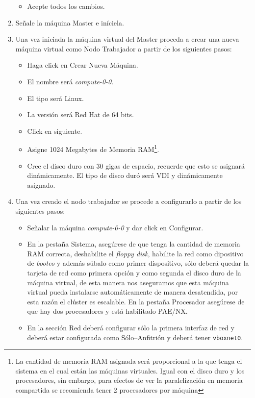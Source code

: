 \documentclass[12pt]{article}
\begin{document}
\begin{enumerate}
\begin{itemize}
  \item Acepte todos los cambios.
  \end{itemize}
\item Señale la máquina Master e iníciela.
\item Una vez iniciada la máquina virtual del Master proceda a crear una nueva máquina virtual como Nodo Trabajador a partir de los siguientes pasos:
  \begin{itemize}
  \item Haga click en Crear Nueva Máquina.
  \item El nombre será \textit{compute-0-0}.
  \item El tipo será Linux.
  \item La versión será Red Hat de 64 bits.
  \item Click en siguiente.
  \item Asigne 1024 Megabytes de Memoria RAM\footnote{La cantidad de memoria RAM asignada será proporcional a la que tenga el sistema en el cual están las máquinas virtuales. Igual con el disco duro y los procesadores, sin embargo, para efectos de ver la paralelización en memoria compartida se recomienda tener 2 procesadores por máquina}.
  \item Cree el disco duro con 30 gigas de espacio, recuerde que esto se asignará dinámicamente. El tipo de disco duró será VDI y dinámicamente asignado.
  \end{itemize}
\item Una vez creado el nodo trabajador se procede a configurarlo a partir de los siguientes pasos:
  \begin{itemize}
  \item Señalar la máquina \textit{compute-0-0} y dar click en Configurar.
  \item En la pestaña Sistema, asegúrese de que tenga la cantidad de memoria RAM correcta, deshabilite el \textit{floppy disk}, habilite la red como dipositivo de \textit{booteo} y además súbalo como primer dispositivo, sólo deberá quedar la tarjeta de red como primera opción y como segunda el disco duro de la máquina virtual, de esta manera nos aseguramos que esta máquina virtual pueda instalarse automáticamente de manera desatendida, por esta razón el clúster es escalable. En la pestaña Procesador asegúrese de que hay dos procesadores y está habilitado PAE/NX.
  \item En la sección Red deberá configurar sólo la primera interfaz de red y deberá estar configurada como Sólo--Anfitrión y deberá tener \texttt{vboxnet0}.

\end{itemize}
\end{enumerate}
\end{document}
